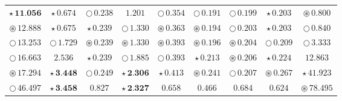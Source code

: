 \documentclass[
]{article}
\begin{document}
\begin{table}[!h]
\begin{tabular}[t]{ccccccccc}
\cellcolor[HTML]{DF536B}$\star\,\textbf{11.056}$ & \cellcolor[HTML]{2297E6}$\star\,\textit{0.674}$ & \cellcolor[HTML]{2297E6}$\bigcirc\,\textit{0.238}$ & \cellcolor[HTML]{FFFFFF}$1.201$ & \cellcolor[HTML]{2297E6}$\bigcirc\,\textit{0.354}$ & \cellcolor[HTML]{F5C710}$\bigcirc\,\textit{0.191}$ & \cellcolor[HTML]{DF536B}$\bigcirc\,\textit{0.199}$ & \cellcolor[HTML]{DF536B}$\star\,\textit{0.203}$ & \cellcolor[HTML]{2297E6}$\circledast\,\textit{0.800}$\\
\cellcolor[HTML]{DF536B}$\circledast\,\textit{12.888}$ & \cellcolor[HTML]{DF536B}$\star\,\textit{0.675}$ & \cellcolor[HTML]{2297E6}$\star\,\textit{0.239}$ & \cellcolor[HTML]{2297E6}$\bigcirc\,\textit{1.330}$ & \cellcolor[HTML]{F5C710}$\circledast\,\textit{0.363}$ & \cellcolor[HTML]{DF536B}$\circledast\,\textit{0.194}$ & \cellcolor[HTML]{F5C710}$\bigcirc\,\textit{0.203}$ & \cellcolor[HTML]{2297E6}$\star\,\textit{0.203}$ & \cellcolor[HTML]{2297E6}$\bigcirc\,\textit{0.840}$\\
\cellcolor[HTML]{DF536B}$\bigcirc\,\textit{13.253}$ & \cellcolor[HTML]{F5C710}$\bigcirc\,\textit{1.729}$ & \cellcolor[HTML]{DF536B}$\circledast\,\textit{0.239}$ & \cellcolor[HTML]{2297E6}$\circledast\,\textit{1.330}$ & \cellcolor[HTML]{DF536B}$\circledast\,\textit{0.393}$ & \cellcolor[HTML]{2297E6}$\circledast\,\textit{0.196}$ & \cellcolor[HTML]{2297E6}$\circledast\,\textit{0.204}$ & \cellcolor[HTML]{F5C710}$\bigcirc\,\textit{0.209}$ & \cellcolor[HTML]{F5C710}$\bigcirc\,\textit{3.333}$\\
\cellcolor[HTML]{2297E6}$\bigcirc\,\textit{16.663}$ & \cellcolor[HTML]{FFFFFF}$2.536$ & \cellcolor[HTML]{DF536B}$\star\,\textit{0.239}$ & \cellcolor[HTML]{F5C710}$\bigcirc\,\textit{1.885}$ & \cellcolor[HTML]{DF536B}$\bigcirc\,\textit{0.393}$ & \cellcolor[HTML]{F5C710}$\star\,\textit{0.213}$ & \cellcolor[HTML]{F5C710}$\circledast\,\textit{0.206}$ & \cellcolor[HTML]{F5C710}$\star\,\textit{0.224}$ & \cellcolor[HTML]{FFFFFF}$12.863$\\
\cellcolor[HTML]{2297E6}$\circledast\,\textit{17.294}$ & \cellcolor[HTML]{2297E6}$\star\,\textbf{3.448}$ & \cellcolor[HTML]{DF536B}$\bigcirc\,\textit{0.249}$ & \cellcolor[HTML]{DF536B}$\star\,\textbf{2.306}$ & \cellcolor[HTML]{F5C710}$\star\,\textit{0.413}$ & \cellcolor[HTML]{F5C710}$\circledast\,\textit{0.241}$ & \cellcolor[HTML]{2297E6}$\bigcirc\,\textit{0.207}$ & \cellcolor[HTML]{F5C710}$\circledast\,\textit{0.267}$ & \cellcolor[HTML]{F5C710}$\star\,\textit{41.923}$\\
\cellcolor[HTML]{F5C710}$\bigcirc\,\textit{46.497}$ & \cellcolor[HTML]{DF536B}$\star\,\textbf{3.458}$ & \cellcolor[HTML]{FFFFFF}$0.827$ & \cellcolor[HTML]{2297E6}$\star\,\textbf{2.327}$ & \cellcolor[HTML]{FFFFFF}$0.658$ & \cellcolor[HTML]{FFFFFF}$0.466$ & \cellcolor[HTML]{FFFFFF}$0.684$ & \cellcolor[HTML]{FFFFFF}$0.624$ & \cellcolor[HTML]{F5C710}$\circledast\,\textit{78.495}$\\

\end{tabular}
\end{table}
\end{document}
